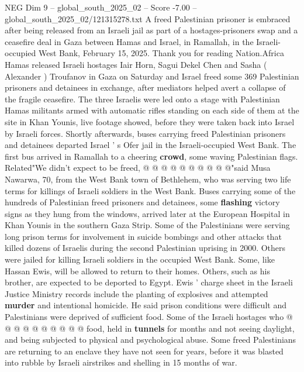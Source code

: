 \begin{textsample}{NEG Dim 9 – global\_south\_2025\_02 – Score -7.00 – global\_south\_2025\_02/121315278.txt}  \label{ex:f9_neg_186}
A freed Palestinian prisoner is embraced after being released from an Israeli jail as part of a hostages-prisoners swap and a ceasefire deal in Gaza between Hamas and Israel, in Ramallah, in the Israeli-occupied West Bank, February 15, 2025.
Thank you for reading Nation.Africa Hamas released Israeli hostages Iair Horn, Sagui Dekel Chen and Sasha ( Alexander ) Troufanov in Gaza on Saturday and Israel freed some 369 Palestinian prisoners and detainees in exchange, after mediators helped avert a collapse of the fragile ceasefire.
The three Israelis were led onto a stage with Palestinian Hamas militants armed with automatic rifles standing on each side of them at the site in Khan Younis, live footage showed, before they were taken back into Israel by Israeli forces.
Shortly afterwards, buses carrying freed Palestinian prisoners and detainees departed Israel ' s Ofer jail in the Israeli-occupied West Bank.
The first bus arrived in Ramallah to a cheering \textbf{crowd}, some waving Palestinian flags.
Related"We didn't expect to be freed, @ @ @ @ @ @ @ @ @ @"said Musa Nawarwa, 70, from the West Bank town of Bethlehem, who was serving two life terms for killings of Israeli soldiers in the West Bank.
Buses carrying some of the hundreds of Palestinian freed prisoners and detainees, some \textbf{flashing} victory signs as they hung from the windows, arrived later at the European Hospital in Khan Younis in the southern Gaza Strip.
Some of the Palestinians were serving long prison terms for involvement in suicide bombings and other attacks that killed dozens of Israelis during the second Palestinian uprising in 2000.
Others were jailed for killing Israeli soldiers in the occupied West Bank.
Some, like Hassan Ewis, will be allowed to return to their homes.
Others, such as his brother, are expected to be deported to Egypt.
Ewis ' charge sheet in the Israeli Justice Ministry records include the planting of explosives and attempted \textbf{murder} and intentional homicide.
He said prison conditions were difficult and Palestinians were deprived of sufficient food.
Some of the Israeli hostages who @ @ @ @ @ @ @ @ @ @ food, held in \textbf{tunnels} for months and not seeing daylight, and being subjected to physical and psychological abuse.
Some freed Palestinians are returning to an enclave they have not seen for years, before it was blasted into rubble by Israeli airstrikes and shelling in 15 months of war.

\end{textsample}
